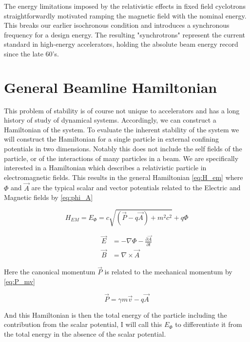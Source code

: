 The energy limitations imposed by the relativistic effects in fixed field cyclotrons straightforwardly motivated ramping the magnetic field with the nominal energy. This breaks our earlier isochronous condition and introduces a synchronous frequency for a design energy. The resulting "synchrotrons" represent the current standard in high-energy accelerators, holding the absolute beam energy record since the late 60's. 

\section{General Beamline Hamiltonian} \label{sec:genHam}

This problem of stability is of course not unique to accelerators and has a long history of study of dynamical systems. Accordingly, we can construct a Hamiltonian of the system. To evaluate the inherent stability of the system we will construct the Hamiltonian for a single particle in external confining potentials in two dimensions. Notably this does not include the self fields of the particle, or of the interactions of many particles in a beam. We are specifically interested in a Hamiltonian which describes a relativistic particle in electromagnetic fields. This results in the general Hamiltonian \ref{eq:H_em} where $\Phi$ and $\vec{A}$ are the typical scalar and vector potentials related to the Electric and Magnetic fields by \ref{eq:phi_A}

\begin{equation} \label{eq:H_em}
H_{EM} = E_{\Phi} = c\sqrt{(\vec{P} - q\vec{A}) + m^2 c^2} + q\Phi
\end{equation}

\begin{equation} \label{eq:phi_A}
\begin{split} 
\vec{E} &= -\nabla \Phi - \frac{\partial \vec{A}}{\partial t}\\
\vec{B} &= \nabla \times \vec{A}
\end{split}
\end{equation}

Here the canonical momentum $\vec{P}$ is related to the mechanical momentum by \ref{eq:P_mv}

\begin{equation} \label{eq:P_mv}
	\vec{P} = \gamma m\vec{v} - q \vec{A}
\end{equation}

And this Hamiltonian is then the total energy of the particle including the contribution from the scalar potential, I will call this $E_{\Phi}$ to differentiate it from the total energy in the absence of the scalar potential.

